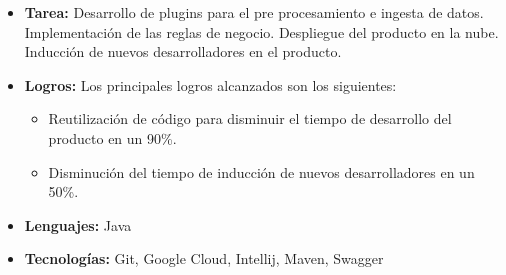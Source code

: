 \documentclass[10pt,a4paper]{altacv}
\begin{document}

\begin{fullwidth}
\makecvheader
\end{fullwidth}


\begin{itemize}
\item \textbf {Tarea:} Desarrollo de plugins para el pre procesamiento e ingesta de datos. Implementación de las reglas de negocio. Despliegue del producto en la nube. Inducción de nuevos desarrolladores en el producto.
 \item \textbf {Logros:} Los principales logros alcanzados son los siguientes:
    \begin{itemize}
    \item Reutilización de código para disminuir el tiempo de desarrollo del producto en un 90\%.
    \item Disminución del tiempo de inducción de nuevos desarrolladores en un 50\%.
  \end{itemize}
 \item \textbf {Lenguajes:} Java
 \item \textbf {Tecnologías:} Git, Google Cloud, Intellij, Maven, Swagger
\end{itemize}

\divider
\end{document}
